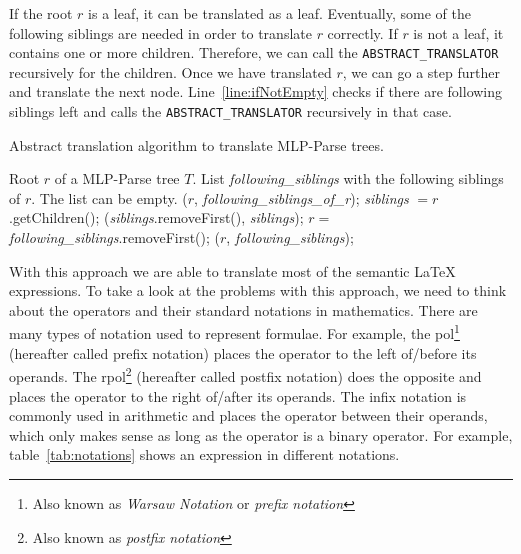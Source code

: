 If the root $r$ is a leaf, it can be translated as a leaf. Eventually, some of the following siblings are needed in order to translate $r$ correctly. If $r$ is not a leaf, it contains one or more children. Therefore, we can call the {\footnotesize \verb|ABSTRACT_TRANSLATOR|} recursively for the children. Once we have translated $r$, we can go a step further and translate the next node. Line~\ref{line:ifNotEmpty} checks if there are following siblings left and calls the {\footnotesize \verb|ABSTRACT_TRANSLATOR|} recursively in that case.

\begin{algorithm}[ht]
\caption{Abstract translation algorithm to translate MLP-Parse trees.}\label{alg:translation}
	\begin{algorithmic}[1]
	\Require Root $r$ of a MLP-Parse tree $T$. List \textit{following\_siblings} with the following siblings of $r$. The list can be empty.
		($r$, \textit{following\_siblings\_of\_r});\label{line:transLeaf}
	\Else
		\State \textit{siblings} $ = r$.getChildren(); 
		(\textit{siblings}.removeFirst(), \textit{siblings});\label{line:transSeq}
	\EndIf
	\label{line:ifNotEmpty}
		\State $r =$ \textit{following\_siblings}.removeFirst();
		($r$, \textit{following\_siblings});
	\EndIf
	\EndProcedure
	\end{algorithmic}
\end{algorithm}

With this approach we are able to translate most of the semantic \LaTeX{} expressions. To take a look at the problems with this approach, we need to think about the operators and their standard notations in mathematics. There are many types of notation used to represent formulae. For example, the \gls{pol}\footnote{Also known as \textit{Warsaw Notation} or \textit{prefix notation}} (hereafter called prefix notation) places the operator to the left of/before its operands. The \gls{rpol}\footnote{Also known as \textit{postfix notation}} (hereafter called postfix notation) does the opposite and places the operator to the right of/after its operands. The infix notation is commonly used in arithmetic and places the operator between their operands, which only makes sense as long as the operator is a binary operator. For example, table~\ref{tab:notations} shows an expression in different notations.

